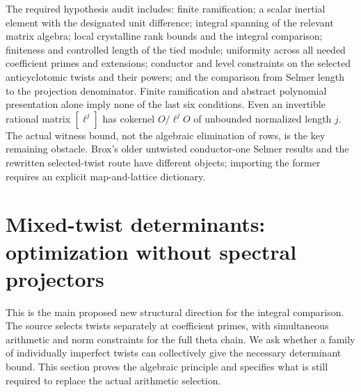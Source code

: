 \documentclass[11pt,a4paper]{article}
\begin{document}
The required hypothesis audit includes: finite ramification; a scalar inertial element with the designated unit difference; integral spanning of the relevant matrix algebra; local crystalline rank bounds and the integral comparison; finiteness and controlled length of the tied module; uniformity across all needed coefficient primes and extensions; conductor and level constraints on the selected anticyclotomic twists and their powers; and the comparison from Selmer length to the projection denominator. Finite ramification and abstract polynomial presentation alone imply none of the last six conditions. Even an invertible rational matrix $[\ell^j]$ has cokernel $O/\ell^jO$ of unbounded normalized length $j$. The actual witness bound, not the algebraic elimination of rows, is the key remaining obstacle. Brox's older untwisted conductor-one Selmer results and the rewritten selected-twist route have different objects; importing the former requires an explicit map-and-lattice dictionary.

\section{Mixed-twist determinants: optimization without spectral projectors}\label{sec:mixed}
This is the main proposed new structural direction for the integral comparison. The source selects twists separately at coefficient primes, with simultaneous arithmetic and norm constraints for the full theta chain. We ask whether a family of individually imperfect twists can collectively give the necessary determinant bound. This section proves the algebraic principle and specifies what is still required to replace the actual arithmetic selection.
\end{document}
